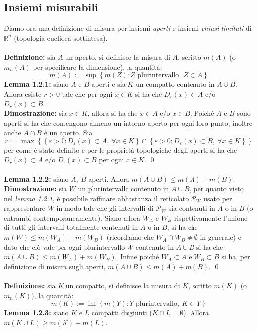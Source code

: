 \documentclass{article}
\numberwithin{equation}{subsection}
\begin{document}
\subsection{Insiemi misurabili}
Diamo ora una definizione di misura per insiemi \textit{aperti} e insiemi \textit{chiusi} \textit{limitati }di $\mathbb{R}^n$ (topologia euclidea sottintesa). \\ \\
\textbf{Definizione:} sia $A$ un aperto, si definisce la misura di $A$, scritto $m(A)$ (o $m_n(A)$ per specificare la dimensione), la quantità:
\begin{equation*}
    m(A) := \sup \left\{ m(Z) : Z \text{ plurintervallo}, \ Z \subset A \right\} 
\end{equation*}
\textbf{Lemma 1.2.1:} siano $A$ e $B$ aperti e sia $K$ un compatto contenuto in $A \cup B$. Allora esiste $r > 0$ tale che per ogni $x \in K$ si ha che $D_r(x) \subset A$ e/o $D_r(x) \subset B$. \\

\textbf{Dimostrazione:} sia $x \in K$, allora si ha che $x \in A$ e/o $x \in B$. Poiché $A$ e $B$ sono aperti si ha che contengono almeno un intorno aperto per ogni loro punto, inoltre anche $A \cap B$ è un aperto. Sia
\begin{equation*}
    r := \max \left\{ \left\{ \varepsilon > 0 : D_{\varepsilon} (x) \subset A, \ \forall x \in K \right\}\cap \left\{ \varepsilon > 0 : D_\varepsilon (x) \subset B, \ \forall x \in K \right\} \right\} 
\end{equation*}
per come è stato definito e per le proprietà topologiche degli aperti si ha che $D_r(x) \subset A$ e/o $D_r(x) \subset B$ per ogni $x \in K$. \qed \\ \\
\textbf{Lemma 1.2.2:} siano $A, \ B$ aperti. Allora $m(A \cup B) \leq m(A) + m(B)$. \\

\textbf{Dimostrazione:} sia $W$ un plurintervallo contenuto in $A \cup B$, per quanto visto nel \textit{lemma 1.2.1}, è possibile raffinare abbastanza il reticolato $\mathcal{P}_W$ usato per rappresentare $W$ in modo tale che gli intervalli di $\mathcal{P}_W$ sia contenuti in $A$ o in $B$ (o entrambi contemporaneamente). Siano allora $W_A$ e $W_B$ rispettivamente l'unione di tutti gli intervalli totalmente contenuti in $A$ o in $B$, si ha che $m(W) \leq m(W_A) + m(W_B)$ (ricordiamo che $W_A \cap W_B \neq \emptyset$ in generale) e dato che ciò vale per ogni plurintervallo $W$ contenuto in $A \cup B$ si ha che $m(A \cup B) \leq m(W_A) + m(W_B)$. Infine poiché $W_A \subset A$ e $W_B \subset B$ si ha, per definizione di misura sugli aperti, $m(A \cup B) \leq m(A) + m(B)$. \qed \\ \\
\textbf{Definizione:} sia $K$ un compatto, si definisce la misura di $K$, scritto $m(K)$ (o $m_n(K))$, la quantità:
\begin{equation*}
    m(K) := \inf \left\{ m(Y) : Y \text{ plurintervallo}, \ K \subset Y \right\} 
\end{equation*}
\textbf{Lemma 1.2.3:} siano $K$ e $L$ compatti disgiunti ($K \cap L = \emptyset$). Allora $m(K \cup L) \geq m(K) + m(L)$. \\
\end{document}
